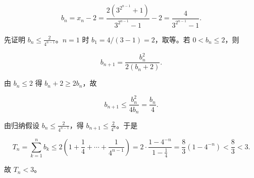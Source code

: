 \begin{answer}
\nopagebreak[4]
\[b_n=x_n-2=\frac{2\left(3^{2^{n-1}}+1\right)}{3^{2^{n-1}}-1}-2
=\frac{4}{3^{2^{n-1}}-1}.\]

先证明 $b_n\leqslant\frac{2}{4^{n-1}}$。$n=1$ 时 $b_1=4/(3-1)=2$，取等。若 $0<b_n\leqslant2$，则

\nopagebreak[4]
\[b_{n+1}=\frac{b_n^2}{2(b_n+2)} .\]

由 $b_n\leqslant2$ 得 $b_n+2\geqslant2b_n$，故

\nopagebreak[4]
\[b_{n+1}\leqslant\frac{b_n^2}{4b_n}=\frac{b_n}{4}.\]

由归纳假设 $b_n\leqslant\frac{2}{4^{n-1}}$，得 $b_{n+1}\leqslant\frac{2}{4^n}$。于是

\nopagebreak[4]
\[T_n=\sum_{k=1}^{n}b_k
\leqslant2\left(1+\frac14+\cdots+\frac{1}{4^{n-1}}\right)
=2\cdot\frac{1-4^{-n}}{1-\frac14}
=\frac83\left(1-4^{-n}\right)<\frac83<3 .\]

故 $T_n<3$。


\end{answer}